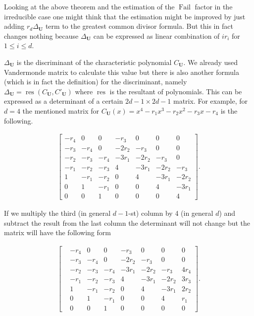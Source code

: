 \documentclass[preprint,12pt]{elsarticle}
\DeclareMathOperator{\fail}{Fail}
\DeclareMathOperator{\res}{res}
\begin{document}
Looking at the above theorem and the estimation of the $\fail$ factor in the irreducible case one might think that the estimation might be improved by just adding $r_d\Delta_\mathbf{U}$ term to the greatest common divisor formula. But this in fact changes nothing because $\Delta_\mathbf{U}$ can be expressed as linear combination of $ir_i$ for $1\leqslant i\leqslant d$. 

$\Delta_\mathbf{U}$ is the discriminant of the characteristic polynomial $C_\mathbf{U}$. We already used Vandermonde matrix to calculate this value but there is also another formula (which is in fact the definition) for the discriminant, namely $\Delta_\mathbf{U} = \res(C_\mathbf{U}, C'_\mathbf{U})$ where $\res$ is the resultant of polynomials. This can be expressed as a determinant of a certain $2d-1\times 2d-1$ matrix. For example, for $d=4$ the mentioned matrix for $C_\mathbf{U}(x) = x^4-r_1x^3-r_2x^2-r_3x -r_4$ is the following.

\begin{align}
    \begin{bmatrix}
        -r_4    &0      &0         &-r_3   &0      &0      &0      \\
        -r_3    &-r_4   &0         &-2r_2  &-r_3   &0      &0      \\
        -r_2    &-r_3   &-r_4      &-3r_1  &-2r_2  &-r_3   &0      \\
        -r_1    &-r_2   &-r_3      &4      &-3r_1  &-2r_2  &-r_3   \\
        1       &-r_1   &-r_2      &0      &4      &-3r_1  &-2r_2  \\
        0       &1      &-r_1      &0      &0      &4      &-3r_1  \\
        0       &0      &1         &0      &0      &0      &4      
    \end{bmatrix}.
\end{align}

If we multiply the third (in general $d-1$-st) column by 4 (in general $d$) and subtract the result from the last column the determinant will not change but the matrix will have the following form

\begin{align}
    \begin{bmatrix}
            &-r_4   &0      &0        &-r_3   &0      &0      &0\\
            &-r_3   &-r_4   &0        &-2r_2  &-r_3   &0      &0\\
            &-r_2   &-r_3   &-r_4     &-3r_1  &-2r_2  &-r_3   &4r_4\\
            &-r_1   &-r_2   &-r_3     &4      &-3r_1  &-2r_2  &3r_3\\
            &1      &-r_1   &-r_2     &0      &4      &-3r_1  &2r_2\\
            &0      &1      &-r_1     &0      &0      &4      &r_1\\
            &0      &0      &1        &0      &0      &0      &0
    \end{bmatrix}.
\end{align}
\end{document}
